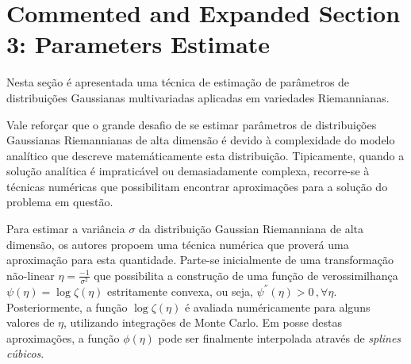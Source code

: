 \documentclass[a4paper,titlepage]{article}
\begin{document}
\section{Commented and Expanded Section 3: Parameters Estimate}
Nesta seção é apresentada uma técnica de estimação de parâmetros de
distribuições Gaussianas multivariadas aplicadas em variedades Riemannianas.

\begin{center}
  \vspace{1em}
  \vspace{1em}
\end{center}

Vale reforçar que o grande desafio de se estimar parâmetros de distribuições
Gaussianas Riemannianas de alta dimensão é devido à complexidade do modelo
analítico que descreve matemáticamente esta distribuição. Tipicamente, quando
a solução analítica é impraticável ou demasiadamente complexa, recorre-se à
técnicas numéricas que possibilitam encontrar aproximações para a solução do
problema em questão.

Para estimar a variância $\sigma$ da distribuição Gaussian Riemanniana de alta
dimensão, os autores propoem uma técnica numérica que proverá uma aproximação
para esta quantidade. Parte-se inicialmente de uma transformação não-linear
$\eta = \frac{-1}{\sigma^2}$ que possibilita a construção de uma função de
verossimilhança $\psi(\eta) = \log \zeta(\eta)$ estritamente convexa, ou seja,
$\psi^{''}(\eta) > 0\,, \forall \eta$. Posteriormente, a função
$\log \zeta(\eta)$ é avaliada numéricamente para alguns valores de $\eta$,
utilizando integrações de Monte Carlo. Em posse destas aproximações, a função
$\phi(\eta)$ pode ser finalmente interpolada através de \textit{splines cúbicos}. 
\end{document}
